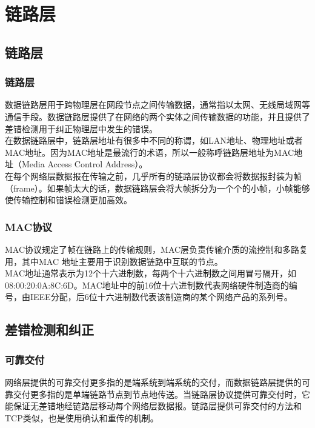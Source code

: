 \chapter{链路层}

\section{链路层}

\subsection{链路层}

数据链路层用于跨物理层在网段节点之间传输数据，通常指以太网、无线局域网等通信手段。数据链路层提供了在网络的两个实体之间传输数据的功能，并且提供了差错检测用于纠正物理层中发生的错误。\\

在数据链路层中，链路层地址有很多中不同的称谓，如LAN地址、物理地址或者MAC地址。因为MAC地址是最流行的术语，所以一般称呼链路层地址为MAC地址（Media Access Control Address）。\\

在每个网络层数据报在传输之前，几乎所有的链路层协议都会将数据报封装为帧（frame）。如果帧太大的话，数据链路层会将大帧拆分为一个个的小帧，小帧能够使传输控制和错误检测更加高效。\\

\subsection{MAC协议}

MAC协议规定了帧在链路上的传输规则，MAC层负责传输介质的流控制和多路复用，其中MAC 地址主要用于识别数据链路中互联的节点。\\

MAC地址通常表示为12个十六进制数，每两个十六进制数之间用冒号隔开，如08:00:20:0A:8C:6D。MAC地址中的前16位十六进制数代表网络硬件制造商的编号，由IEEE分配，后6位十六进制数代表该制造商的某个网络产品的系列号。

\newpage

\section{差错检测和纠正}

\subsection{可靠交付}

网络层提供的可靠交付更多指的是端系统到端系统的交付，而数据链路层提供的可靠交付更多指的是单端链路节点到节点地传送。当链路层协议提供可靠交付时，它能保证无差错地经链路层移动每个网络层数据报。链路层提供可靠交付的方法和TCP类似，也是使用确认和重传的机制。\\

